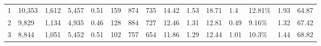\documentclass[11pt,a4paper]{article}
\begin{document}
\begin{table*}[h]
{\begin{tabular}{l|llll|lllllllll|l}
1               & 10,353                                                            & 1,612                                                               & 5,457                                                               & 0.51                                                               & 159              & 874                   & 735                                                                          & 14.42                                                                          & 1.53                                                                          & 18.71                                                                            & 1.4                                                                                       & 12.81\%                                                                                   & 1.93                                                                                       & 64.87                                                                                     \\
2               & 9,829                                                             & 1,134                                                               & 4,935                                                               & 0.46                                                               & 128              & 884                   & 727                                                                          & 12.46                                                                          & 1.31                                                                          & 12.81                                                                            & 0.49                                                                                      & 9.16\%                                                                                    & 1.32                                                                                       & 67.42                                                                                     \\
3               & 8,844                                                             & 1,051                                                               & 5,452                                                               & 0.51                                                               & 102              & 757                   & 654                                                                          & 11.86                                                                          & 1.29                                                                          & 12.44                                                                            & 1.01                                                                                      & 10.3\%                                                                                    & 1.44                                                                                       & 68.82                                                                                     \\ \hline

\end{tabular}}
\end{table*}
\end{document}
